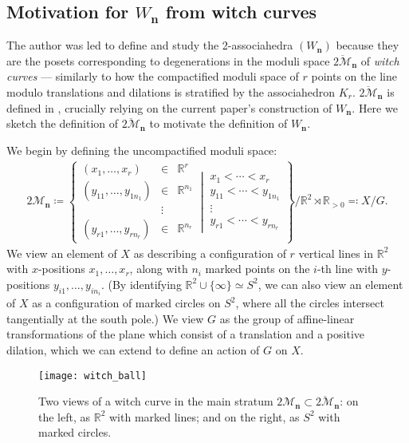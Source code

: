 \documentclass[11pt]{amsart}
\theoremstyle{definition}
\theoremstyle{remark}
\theoremstyle{plain}
\newcommand\cM{\mathcal{M}}
\newcommand{\bR}{\mathbb{R}}
\newcommand\bn{\mathbf{n}}
\newcommand{\ol}{\overline}
\begin{document}
\subsection{Motivation for \texorpdfstring{$W_\bn$}{Wn} from witch curves}
\label{ss:motivation}

The author was led to define and study the 2-associahedra
$(W_\bn)$
because they are the posets corresponding to degenerations in the moduli space $\ol{2\cM}_\bn$ of \emph{witch curves}
--- similarly to how the compactified moduli space of $r$ points on the line modulo translations and dilations is stratified by the associahedron $K_r$.
$\ol{2\cM}_\bn$
is defined in \cite{b:realization}, crucially relying on the current paper's construction of $W_\bn$.
Here we sketch the definition of $\ol{2\cM}_\bn$ to motivate the definition of
$W_\bn$.


We begin by defining the uncompactified moduli space:
\begin{align}
2\cM_\bn \coloneqq \left\{
\begin{array}{rcl}
(x_1,\ldots,x_r) &\in& \bR^r \\
(y_{11},\ldots,y_{1n_1}) &\in& \bR^{n_1} \\
&\vdots& \\
(y_{r1},\ldots,y_{rn_r}) &\in& \bR^{n_r}
\end{array}
\:\left|\:
\begin{array}{c}
x_1 < \cdots < x_r \\
y_{11} < \cdots < y_{1n_1} \\
\vdots \\
y_{r1} < \cdots < y_{rn_r}
\end{array}
\right.\right\}\Big/\bR^2 \rtimes \bR_{>0} \eqqcolon X/G.
\end{align}
We view an element of $X$ as describing a configuration of $r$ vertical lines in $\bR^2$ with $x$-positions $x_1, \ldots, x_r$, along with $n_i$ marked points on the $i$-th line with $y$-positions $y_{i1}, \ldots, y_{in_i}$.
(By identifying $\bR^2 \cup \{\infty\} \simeq S^2$, we can also view an element of $X$ as a configuration of marked circles on $S^2$, where all the circles intersect tangentially at the south pole.)
We view $G$ as the group of affine-linear transformations of the plane which consist of a translation and a positive dilation, which we can extend to define an action of $G$ on $X$.

\begin{figure}[H]
\centering
\texttt{[image: witch\_ball]}
\caption{Two views of a witch curve in the main stratum $2\cM_\bn \subset \ol{2\cM}_\bn$: on the left, as $\bR^2$ with marked lines; and on the right, as $S^2$ with marked circles.}
\label{fig:witch_ball}
\end{figure}
\end{document}

